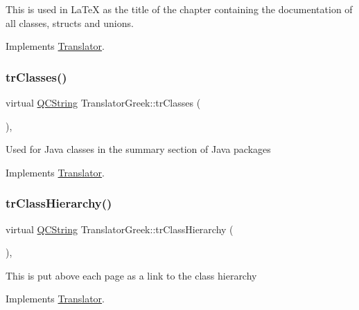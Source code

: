 This is used in La\+TeX as the title of the chapter containing the documentation of all classes, structs and unions. 

Implements \mbox{\hyperlink{class_translator}{Translator}}.

\mbox{\label{class_translator_greek_a7618d01245d2566527c86729b6fec050}} 
\subsubsection{\texorpdfstring{trClasses()}{trClasses()}}
{\footnotesize\ttfamily virtual \mbox{\hyperlink{class_q_c_string}{Q\+C\+String}} Translator\+Greek\+::tr\+Classes (\begin{DoxyParamCaption}{ }\end{DoxyParamCaption})\hspace{0.3cm}{\ttfamily [inline]}, {\ttfamily [virtual]}}

Used for Java classes in the summary section of Java packages 

Implements \mbox{\hyperlink{class_translator}{Translator}}.

\mbox{\label{class_translator_greek_ac3fbec508f79dae21937a0268c2bf176}} 
\subsubsection{\texorpdfstring{trClassHierarchy()}{trClassHierarchy()}}
{\footnotesize\ttfamily virtual \mbox{\hyperlink{class_q_c_string}{Q\+C\+String}} Translator\+Greek\+::tr\+Class\+Hierarchy (\begin{DoxyParamCaption}{ }\end{DoxyParamCaption})\hspace{0.3cm}{\ttfamily [inline]}, {\ttfamily [virtual]}}

This is put above each page as a link to the class hierarchy 

Implements \mbox{\hyperlink{class_translator}{Translator}}.

\mbox{\label{class_translator_greek_a9848fe30201b92f324a145141406722f}} 
